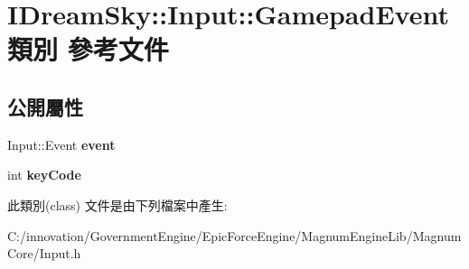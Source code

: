 \hypertarget{class_i_dream_sky_1_1_input_1_1_gamepad_event}{}\section{I\+Dream\+Sky\+:\+:Input\+:\+:Gamepad\+Event 類別 參考文件}
\label{class_i_dream_sky_1_1_input_1_1_gamepad_event}
\subsection*{公開屬性}
\begin{DoxyCompactItemize}
\item 
Input\+::\+Event {\bfseries event}\hypertarget{class_i_dream_sky_1_1_input_1_1_gamepad_event_ab0f81f7728168b594c729f90f6da5972}{}\label{class_i_dream_sky_1_1_input_1_1_gamepad_event_ab0f81f7728168b594c729f90f6da5972}

\item 
int {\bfseries key\+Code}\hypertarget{class_i_dream_sky_1_1_input_1_1_gamepad_event_aca0eceb20be290458a5cd886c81c5100}{}\label{class_i_dream_sky_1_1_input_1_1_gamepad_event_aca0eceb20be290458a5cd886c81c5100}

\end{DoxyCompactItemize}


此類別(class) 文件是由下列檔案中產生\+:\begin{DoxyCompactItemize}
\item 
C\+:/innovation/\+Government\+Engine/\+Epic\+Force\+Engine/\+Magnum\+Engine\+Lib/\+Magnum\+Core/Input.\+h\end{DoxyCompactItemize}
